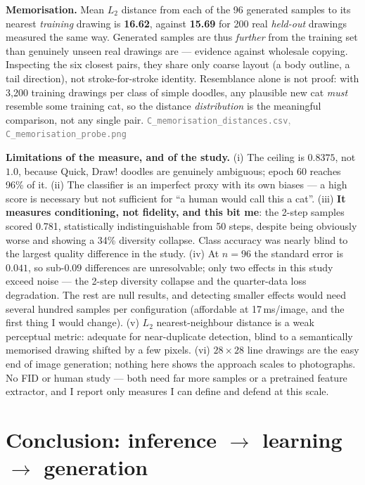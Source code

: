 \documentclass[10pt,a4paper]{article}
\begin{document}
\textbf{Memorisation.} Mean $L_2$ distance from each of the 96 generated samples to its nearest
\emph{training} drawing is \textbf{16.62}, against \textbf{15.69} for 200 real \emph{held-out} drawings
measured the same way. Generated samples are thus \emph{further} from the training set than genuinely
unseen real drawings are --- evidence against wholesale copying. Inspecting the six closest pairs, they
share only coarse layout (a body outline, a tail direction), not stroke-for-stroke identity. Resemblance
alone is not proof: with 3{,}200 training drawings per class of simple doodles, any plausible new cat
\emph{must} resemble some training cat, so the distance \emph{distribution} is the meaningful comparison,
not any single pair. \textcolor{gray}{\small\texttt{C\_memorisation\_distances.csv}, \texttt{C\_memorisation\_probe.png}}

\textbf{Limitations of the measure, and of the study.}
(i) The ceiling is $0.8375$, not $1.0$, because Quick, Draw! doodles are genuinely ambiguous; epoch 60
reaches 96\% of it. (ii) The classifier is an imperfect proxy with its own biases --- a high score is
necessary but not sufficient for ``a human would call this a cat''. (iii) \textbf{It measures
conditioning, not fidelity, and this bit me}: the 2-step samples scored 0.781, statistically
indistinguishable from 50 steps, despite being obviously worse and showing a 34\% diversity collapse.
Class accuracy was nearly blind to the largest quality difference in the study. (iv) At $n{=}96$ the
standard error is $0.041$, so sub-$0.09$ differences are unresolvable; only two effects in this study
exceed noise --- the 2-step diversity collapse and the quarter-data loss degradation. The rest are null
results, and detecting smaller effects would need several hundred samples per configuration (affordable
at 17\,ms/image, and the first thing I would change). (v) $L_2$ nearest-neighbour distance is a weak
perceptual metric: adequate for near-duplicate detection, blind to a semantically memorised drawing
shifted by a few pixels. (vi) $28\times28$ line drawings are the easy end of image generation; nothing
here shows the approach scales to photographs. No FID or human study --- both need far more samples or
a pretrained feature extractor, and I report only measures I can define and defend at this scale.

\section{Conclusion: inference $\rightarrow$ learning $\rightarrow$ generation}
\end{document}
